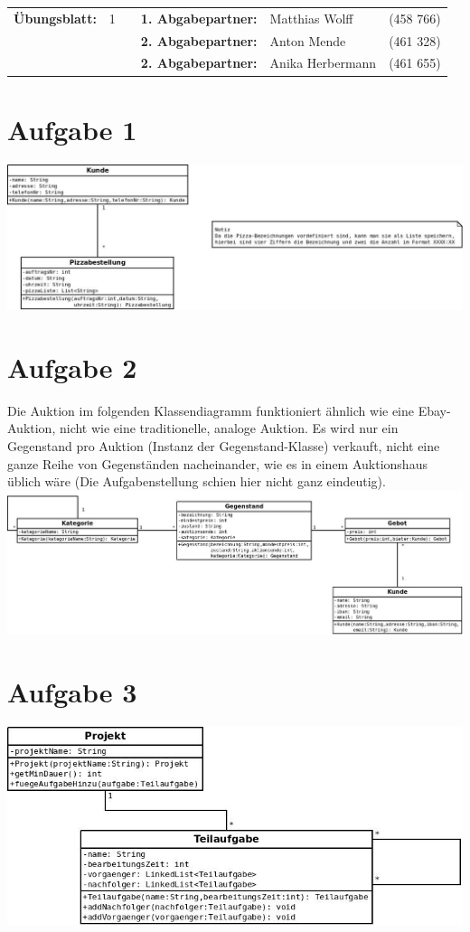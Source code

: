 \newcommand{\obenlinks}{Software Engineering}		%

\usepackage{float}


	\begin{center}
		\begin{tabular}{|rlp{4cm}rll|}
		\hline
		 \textbf{Übungsblatt:} & 1 &   & \textbf{1. Abgabepartner:} & Matthias Wolff & (458 766)  \\
		        & & & \textbf{2. Abgabepartner:} & Anton Mende & (461 328) \\
		        & & & \textbf{2. Abgabepartner:} & Anika Herbermann & (461 655) \\ \hline
		\end{tabular}
	\end{center}
\section*{Aufgabe 1}
\includegraphics[width=\textwidth,height=\textheight,keepaspectratio]{Aufgabe1.jpeg}
\section*{Aufgabe 2}
Die Auktion im folgenden Klassendiagramm funktioniert ähnlich wie eine Ebay-Auktion, nicht wie eine traditionelle, analoge Auktion. Es wird nur ein Gegenstand pro Auktion (Instanz der Gegenstand-Klasse) verkauft, nicht eine ganze Reihe von Gegenständen nacheinander, wie es in einem Auktionshaus üblich wäre (Die Aufgabenstellung schien hier nicht ganz eindeutig).\\
\includegraphics*[width=\textwidth,height=\textheight,keepaspectratio]{Aufgabe2.jpeg}
\section*{Aufgabe 3}
\includegraphics*[width=\textwidth,height=\textheight,keepaspectratio]{Aufgabe3.jpeg}

